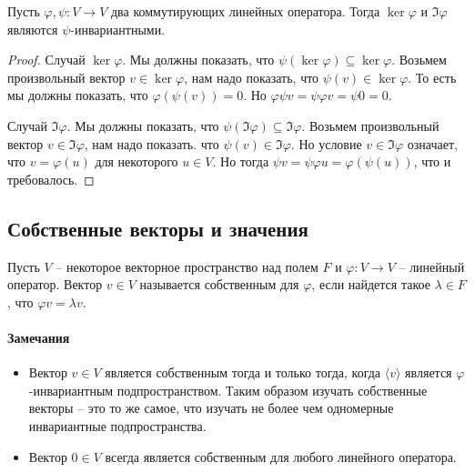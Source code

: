
\begin{claim}
Пусть $\varphi,\psi\colon V\to V$ два коммутирующих линейных оператора. Тогда $\ker \varphi$ и $\Im\varphi$ являются $\psi$-инвариантными.
\end{claim}
\begin{proof}
Случай $\ker \varphi$. Мы должны показать, что $\psi(\ker\varphi) \subseteq \ker \varphi$. Возьмем произвольный вектор $v\in \ker\varphi$, нам надо показать, что $\psi(v) \in \ker \varphi$. То есть мы должны показать, что $\varphi(\psi(v)) = 0$. Но $\varphi \psi v = \psi \varphi v = \psi 0 = 0$.

Случай $\Im \varphi$. Мы должны показать, что $\psi(\Im \varphi) \subseteq \Im \varphi$. Возьмем произвольный вектор $v\in \Im\varphi$, нам надо показать. что $\psi(v) \in \Im\varphi$. Но условие $v\in \Im \varphi$ означает, что $v = \varphi (u)$ для некоторого $u\in V$. Но тогда $\psi v = \psi \varphi u = \varphi (\psi(u))$, что и требовалось.
\end{proof}

\subsection{Собственные векторы и значения}

\begin{definition}
Пусть $V$ -- некоторое векторное пространство над полем $F$ и $\varphi \colon V\to V$ -- линейный оператор. Вектор $v\in V$ называется собственным для $\varphi$, если найдется такое $\lambda \in F$, что $\varphi v = \lambda v$.
\end{definition}

\paragraph{Замечания}

\begin{itemize}

\item Вектор $v\in V$ является собственным тогда и только тогда, когда $\langle v \rangle$ является $\varphi$-инвариантным подпространством. Таким образом изучать собственные векторы -- это то же самое, что изучать не более чем одномерные инвариантные подпространства. 

\item Вектор $0\in V$ всегда является собственным для любого линейного оператора.
\end{itemize}

